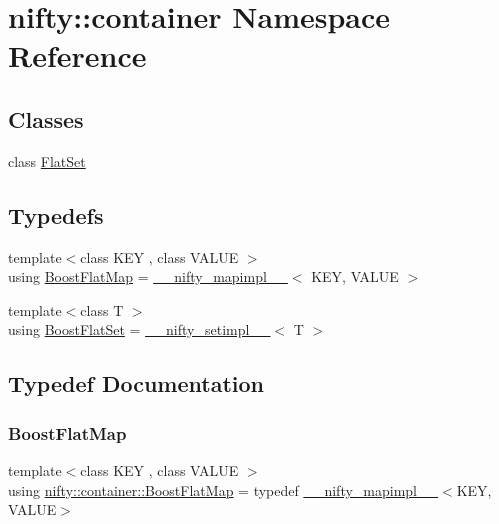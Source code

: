 \hypertarget{namespacenifty_1_1container}{}\section{nifty\+:\+:container Namespace Reference}
\label{namespacenifty_1_1container}
\subsection*{Classes}
\begin{DoxyCompactItemize}
\item 
class \hyperlink{classnifty_1_1container_1_1FlatSet}{Flat\+Set}
\end{DoxyCompactItemize}
\subsection*{Typedefs}
\begin{DoxyCompactItemize}
\item 
{\footnotesize template$<$class K\+EY , class V\+A\+L\+UE $>$ }\\using \hyperlink{namespacenifty_1_1container_a8abdd6362500b879a071a7403f6f199a}{Boost\+Flat\+Map} = \hyperlink{boost__flat__map_8hxx_a5e8f06e6da8064e1b54cb72c7bf87b80}{\+\_\+\+\_\+nifty\+\_\+mapimpl\+\_\+\+\_\+}$<$ K\+EY, V\+A\+L\+UE $>$
\item 
{\footnotesize template$<$class T $>$ }\\using \hyperlink{namespacenifty_1_1container_ad9f6bbba60eac29f50d418e4c09d5c7b}{Boost\+Flat\+Set} = \hyperlink{boost__flat__set_8hxx_a6b7afcb706c8e2ecfc2e7c25c7291148}{\+\_\+\+\_\+nifty\+\_\+setimpl\+\_\+\+\_\+}$<$ T $>$
\end{DoxyCompactItemize}


\subsection{Typedef Documentation}
\mbox{\label{namespacenifty_1_1container_a8abdd6362500b879a071a7403f6f199a}} 
\subsubsection{\texorpdfstring{Boost\+Flat\+Map}{BoostFlatMap}}
{\footnotesize\ttfamily template$<$class K\+EY , class V\+A\+L\+UE $>$ \\
using \hyperlink{namespacenifty_1_1container_a8abdd6362500b879a071a7403f6f199a}{nifty\+::container\+::\+Boost\+Flat\+Map} = typedef \hyperlink{boost__flat__map_8hxx_a5e8f06e6da8064e1b54cb72c7bf87b80}{\+\_\+\+\_\+nifty\+\_\+mapimpl\+\_\+\+\_\+}$<$K\+EY, V\+A\+L\+UE$>$}

